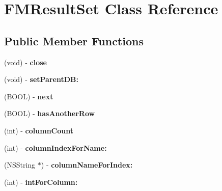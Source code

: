 \hypertarget{interface_f_m_result_set}{
\section{FMResultSet Class Reference}
\label{interface_f_m_result_set}
}
\subsection*{Public Member Functions}
\begin{DoxyCompactItemize}
\item 
\hypertarget{interface_f_m_result_set_a5ae591df94fc66ccb85cbb6565368bca}{
(void) -\/ {\bfseries close}}
\label{interface_f_m_result_set_a5ae591df94fc66ccb85cbb6565368bca}

\item 
\hypertarget{interface_f_m_result_set_a52ff0471b7c293d7b2472c75aff30e82}{
(void) -\/ {\bfseries setParentDB:}}
\label{interface_f_m_result_set_a52ff0471b7c293d7b2472c75aff30e82}

\item 
\hypertarget{interface_f_m_result_set_a966edc20a433f1f4c77c0ddceffe2237}{
(BOOL) -\/ {\bfseries next}}
\label{interface_f_m_result_set_a966edc20a433f1f4c77c0ddceffe2237}

\item 
\hypertarget{interface_f_m_result_set_a4a42296a4d64da61b16aa229455f7c12}{
(BOOL) -\/ {\bfseries hasAnotherRow}}
\label{interface_f_m_result_set_a4a42296a4d64da61b16aa229455f7c12}

\item 
\hypertarget{interface_f_m_result_set_a43261d8110f24c1f9abda3d5b811baaf}{
(int) -\/ {\bfseries columnCount}}
\label{interface_f_m_result_set_a43261d8110f24c1f9abda3d5b811baaf}

\item 
\hypertarget{interface_f_m_result_set_a4865cb220390e3e455f48f0f80393a9c}{
(int) -\/ {\bfseries columnIndexForName:}}
\label{interface_f_m_result_set_a4865cb220390e3e455f48f0f80393a9c}

\item 
\hypertarget{interface_f_m_result_set_a685795100389784f136b2c7de2d2f7f0}{
(NSString $\ast$) -\/ {\bfseries columnNameForIndex:}}
\label{interface_f_m_result_set_a685795100389784f136b2c7de2d2f7f0}

\item 
\hypertarget{interface_f_m_result_set_a6d229b5665d8ee2908154a3049a0679e}{
(int) -\/ {\bfseries intForColumn:}}
\label{interface_f_m_result_set_a6d229b5665d8ee2908154a3049a0679e}


\end{DoxyCompactItemize}
